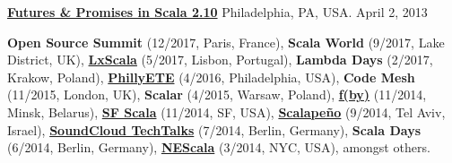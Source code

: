 \documentclass[9pt]{article}
\begin{document}
\noindent\href{http://lampwww.epfl.ch/~hmiller/files/Futures-Try-PhillyETE.pdf}{\bf Futures \& Promises in Scala 2.10} 
\linebreak\noindent Philadelphia, PA, USA. April 2, 2013
\bigskip

{}
\medskip
\newline\noindent
{\bf Open Source Summit} (12/2017, Paris, France),
{\bf Scala World} (9/2017, Lake District, UK),
{\bf \href{https://youtu.be/17yy5BwIiTw}{LxScala}} (5/2017, Lisbon, Portugal),
{\bf Lambda Days} (2/2017, Krakow, Poland),
{\bf\href{https://www.youtube.com/watch?v=67UNErFdr64}{PhillyETE}} (4/2016, Philadelphia, USA),
{\bf Code Mesh} (11/2015, London, UK),
{\bf Scalar} (4/2015, Warsaw, Poland),
{\bf\href{http://fby.by/}{f(by)}} (11/2014, Minsk, Belarus),
{\bf\href{https://www.youtube.com/watch?v=4obTnLVXQWY}{SF Scala}} (11/2014, SF, USA),
{\bf\href{http://www.scalapeno.org.il/#!heather-miller/cj0q}{Scalape\~{n}o}} (9/2014, Tel Aviv, Israel),
{\bf \href{https://www.eventbrite.com/e/soundcloud-techtalks-unconventional-thinking-in-design-and-programming-tickets-12166429117}{SoundCloud TechTalks}} (7/2014, Berlin, Germany),
{\bf Scala Days} (6/2014, Berlin, Germany),
{\bf\href{http://www.nescala.org/2014}{NEScala}} (3/2014, NYC, USA), amongst others.

\bigskip




\end{document}
